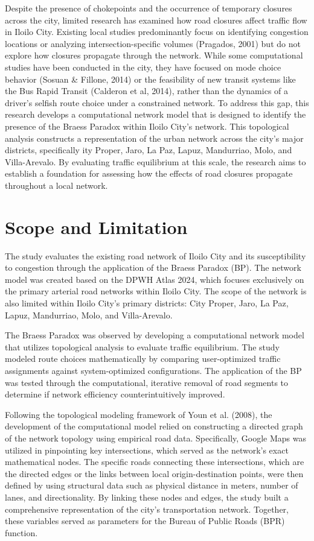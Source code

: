 Despite the presence of chokepoints and the occurrence of temporary closures across the city, limited research has examined how road closures affect traffic flow in Iloilo City. Existing local studies predominantly focus on identifying congestion locations or analyzing intersection-specific volumes (Pragados, 2001) but do not explore how closures propagate through the network. While some computational studies have been conducted in the city, they have focused on mode choice behavior (Sosuan \& Fillone, 2014) or the feasibility of new transit systems like the Bus Rapid Transit (Calderon et al, 2014), rather than the dynamics of a driver's selfish route choice under a constrained network.  To address this gap, this research develops a computational network model that is designed to identify the presence of the Braess Paradox within Iloilo City's network. This topological analysis constructs a representation of the urban network across the city's major districts, specifically ity Proper, Jaro, La Paz, Lapuz, Mandurriao, Molo, and Villa-Arevalo. By evaluating traffic equilibrium at this scale, the research aims to establish a foundation for assessing how the effects of road closures propagate throughout a local network.

\section{Scope and Limitation}
\label{sec:scope_limitation}

The study evaluates the existing road network of Iloilo City and its susceptibility to congestion through the application of the Braess Paradox (BP). The network model was created based on the DPWH Atlas 2024, which focuses exclusively on the primary arterial road networks within Iloilo City. The scope of the network is also limited within Iloilo City's primary districts: City Proper, Jaro, La Paz, Lapuz, Mandurriao, Molo, and Villa-Arevalo.

The Braess Paradox was observed by developing a computational network model that utilizes topological analysis to evaluate traffic equilibrium. The study modeled route choices mathematically by comparing user-optimized traffic assignments against system-optimized configurations. The application of the BP was tested through the computational, iterative removal of road segments to determine if network efficiency counterintuitively improved.

Following the topological modeling framework of Youn et al. (2008), the development of the computational model relied on constructing a directed graph of the network topology using empirical road data. Specifically, Google Maps was utilized in pinpointing key intersections, which served as the network's exact mathematical nodes. The specific roads connecting these intersections, which are the directed edges or the links between local origin-destination points, were then defined by using structural data such as physical distance in meters, number of lanes, and directionality. By linking these nodes and edges, the study built a comprehensive representation of the city's transportation network. Together, these variables served as parameters for the Bureau of Public Roads (BPR) function.

